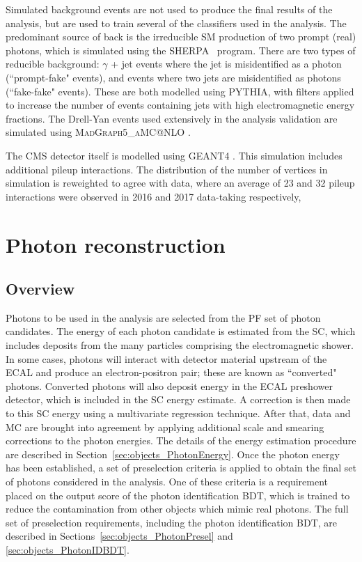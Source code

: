 Simulated background events are not used to produce the final results of the analysis, 
but are used to train several of the classifiers used in the analysis.
The predominant source of back is the irreducible SM production of two prompt (real) photons, 
which is simulated using the \textsc{SHERPA}~\cite{sherpa} program. %
There are two types of reducible background: $\gamma$ + jet events where the jet is misidentified as a photon (``prompt-fake" events), 
and events where two jets are misidentified as photons (``fake-fake" events).
These are both modelled using \textsc{PYTHIA}, 
with filters applied to increase the number of events containing jets with high electromagnetic energy fractions.
The Drell-Yan events used extensively in the analysis validation are simulated using \textsc{MadGraph5_{}aMC@NLO} \cite{Madgraph}. 

The CMS detector itself is modelled using \textsc{GEANT4} \cite{Geant4}.
This simulation includes additional pileup interactions.
The distribution of the number of vertices in simulation is reweighted to agree with data, 
where an average of 23 and 32 pileup interactions were observed in 2016 and 2017 data-taking respectively, 

\section{Photon reconstruction}
\subsection{Overview}

Photons to be used in the \Hgg analysis are selected from the PF set of photon candidates.
The energy of each photon candidate is estimated from the SC, 
which includes deposits from the many particles comprising the electromagnetic shower.
In some cases, photons will interact with detector material upstream of the ECAL 
and produce an electron-positron pair; these are known as ``converted" photons.
Converted photons will also deposit energy in the ECAL preshower detector, 
which is included in the SC energy estimate.
A correction is then made to this SC energy using a multivariate regression technique.
After that, data and MC are brought into agreement by applying additional scale and smearing corrections to the photon energies.
The details of the energy estimation procedure are described in Section~\ref{sec:objects_PhotonEnergy}.
Once the photon energy has been established, 
a set of preselection criteria is applied to obtain the final set of photons considered in the analysis.
One of these criteria is a requirement placed on the output score of the photon identification BDT, 
which is trained to reduce the contamination from other objects which mimic real photons.
The full set of preselection requirements, including the photon identification BDT, 
are described in Sections~\ref{sec:objects_PhotonPresel} and \ref{sec:objects_PhotonIDBDT}.

